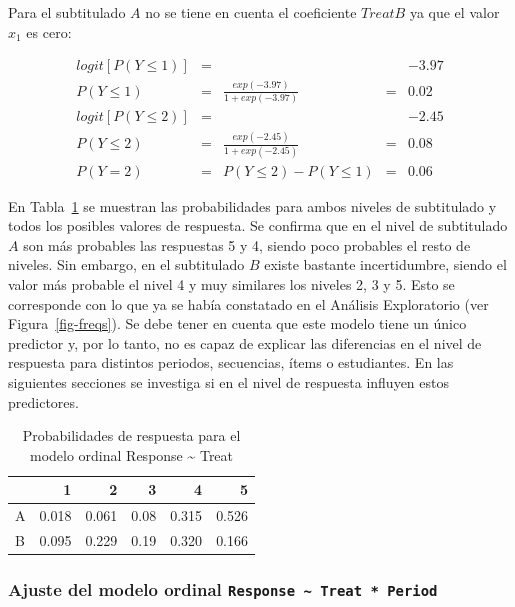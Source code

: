 \documentclass[
  12pt,
  a4paper,
  extrafontsizes,
  onecolumn,
  openright,
  table]{memoir}
\begin{document}
Para el subtitulado \(A\) no se tiene en cuenta el coeficiente
\(TreatB\) ya que el valor \(x_1\) es cero:

\[
\begin{aligned}
logit [P(Y \le 1)] & = & & & -3.97 \\
P(Y \le 1) & = & \frac{exp(-3.97)}{1 + exp(-3.97)} & = & 0.02 \\
logit [P(Y \le 2)] & = & & & -2.45 \\
P(Y \le 2) & = & \frac{exp(-2.45)}{1 + exp(-2.45)} & = & 0.08 \\
P(Y = 2) & = & P(Y \le 2) - P(Y \le 1) & = &  0.06 
\end{aligned}
\]

En Tabla~\ref{tbl-probs-clm-treat} se muestran las probabilidades para
ambos niveles de subtitulado y todos los posibles valores de respuesta.
Se confirma que en el nivel de subtitulado \(A\) son más probables las
respuestas 5 y 4, siendo poco probables el resto de niveles. Sin
embargo, en el subtitulado \(B\) existe bastante incertidumbre, siendo
el valor más probable el nivel 4 y muy similares los niveles 2, 3 y 5.
Esto se corresponde con lo que ya se había constatado en el Análisis
Exploratorio (ver Figura~\ref{fig-freqs}). Se debe tener en cuenta que
este modelo tiene un único predictor y, por lo tanto, no es capaz de
explicar las diferencias en el nivel de respuesta para distintos
periodos, secuencias, ítems o estudiantes. En las siguientes secciones
se investiga si en el nivel de respuesta influyen estos predictores.

\hypertarget{tbl-probs-clm-treat}{}
\begin{table}
\caption{\label{tbl-probs-clm-treat}Probabilidades de respuesta para el modelo ordinal Response
\textasciitilde{} Treat }\tabularnewline

\centering
\begin{tabular}{l|r|r|r|r|r}
\hline
  & 1 & 2 & 3 & 4 & 5\\
\hline
A & 0.018 & 0.061 & 0.08 & 0.315 & 0.526\\
\hline
B & 0.095 & 0.229 & 0.19 & 0.320 & 0.166\\
\hline
\end{tabular}
\end{table}

\hypertarget{sec-response-treat.period}{%
\subsubsection{\texorpdfstring{Ajuste del modelo ordinal
\texttt{Response\ \textasciitilde{}\ Treat\ *\ Period}}{Ajuste del modelo ordinal Response \textasciitilde{} Treat * Period}}\label{sec-response-treat.period}}
\end{document}
